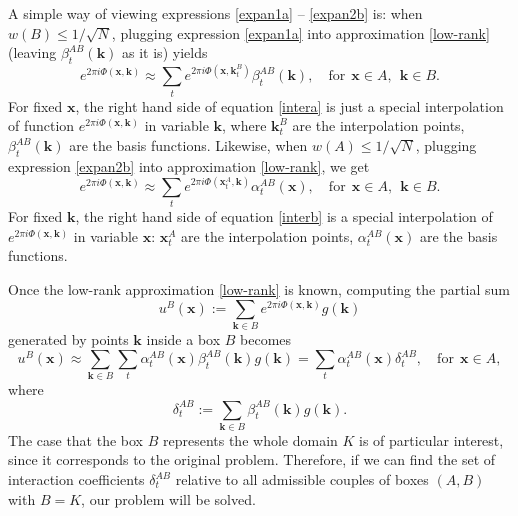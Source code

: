 
A simple way of viewing expressions \ref{expan1a} -- \ref{expan2b} is:  when $w(B)\leq1/\sqrt{N}$, plugging expression \ref{expan1a} into approximation \ref{low-rank} (leaving $\beta_t^{AB}(\mathbf{k})$ as it is) yields
\begin{equation} \label{intera}
e^{2\pi i \Phi(\mathbf{x},\mathbf{k})}  \approx \sum_t 
e^{2\pi i \Phi(\mathbf{x},\mathbf{k}_t^B)}\beta_t^{AB}(\mathbf{k}), \quad \text{for} \  \  \mathbf{x}\in
A, \ \ \mathbf{k}\in B.
\end{equation}
For fixed $\mathbf{x}$, the right hand side of equation \ref{intera} is just a special interpolation of function $e^{2\pi i \Phi(\mathbf{x},\mathbf{k})}$ in variable $\mathbf{k}$, where $\mathbf{k}_t^B$ are the interpolation points, $\beta_t^{AB}(\mathbf{k})$ are the basis functions. Likewise, when $w(A)\leq1/\sqrt{N}$, plugging expression \ref{expan2b} into approximation \ref{low-rank}, we get
\begin{equation} \label{interb}
e^{2\pi i \Phi(\mathbf{x},\mathbf{k})}  \approx \sum_t 
e^{2\pi i \Phi(\mathbf{x}_t^A,\mathbf{k})}\alpha_t^{AB}(\mathbf{x}), \quad \text{for} \  \  \mathbf{x}\in A, \ \ \mathbf{k}\in B.
\end{equation}
For fixed $\mathbf{k}$, the right hand side of equation \ref{interb} is a special interpolation of $e^{2\pi i\Phi(\mathbf{x},\mathbf{k})}$ in variable $\mathbf{x}$: $\mathbf{x}_t^A$ are the interpolation points, $\alpha_t^{AB}(\mathbf{x})$ are the basis functions. 

Once the low-rank approximation \ref{low-rank} is known, computing the partial sum 
\begin{equation} \label{partial}
u^{B}(\mathbf{x}):=\sum_{\mathbf{k}\in B}e^{2\pi i
  \Phi(\mathbf{x},\mathbf{k})}g(\mathbf{k})
\end{equation}
generated by points $\mathbf{k}$ inside a box $B$ becomes
\begin{equation} \label{partial1}
u^{B}(\mathbf{x})\approx  \sum_{\mathbf{k}\in B} \sum_t
\alpha_t^{AB}(\mathbf{x})\beta_t^{AB}(\mathbf{k}) g(\mathbf{k}) =
\sum_t \alpha_t^{AB}(\mathbf{x})\delta_t^{AB},  \quad \text{for} \  \ \mathbf{x}\in A,
\end{equation}
where
\begin{equation} \label{def}
\delta_t^{AB}:=\sum_{\mathbf{k}\in B} \beta_t^{AB}(\mathbf{k})g(\mathbf{k}).
\end{equation}
The case that the box $B$ represents the whole domain $K$ is of particular interest, since it corresponds to the original problem. Therefore, if we can find the set of interaction coefficients $\delta_t^{AB}$ relative to all admissible couples of boxes $(A,B)$ with $B=K$, our problem will be solved. 

